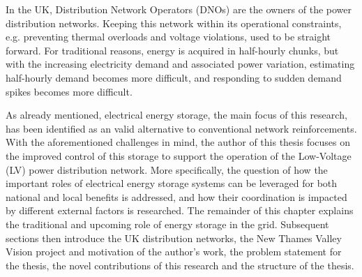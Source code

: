 In the UK, Distribution Network Operators (DNOs) are the owners of the power distribution networks.
Keeping this network within its operational constraints, e.g. preventing thermal overloads and voltage violations, used to be straight forward.
For traditional reasons, energy is acquired in half-hourly chunks, but with the increasing electricity demand and associated power variation, estimating half-hourly demand becomes more difficult, and responding to sudden demand spikes becomes more difficult.

As already mentioned, electrical energy storage, the main focus of this research, has been identified as an valid alternative to conventional network reinforcements.
With the aforementioned challenges in mind, the author of this thesis focuses on the improved control of this storage to support the operation of the Low-Voltage (LV) power distribution network.
More specifically, the question of how the important roles of electrical energy storage systems can be leveraged for both national and local benefits is addressed, and how their coordination is impacted by different external factors is researched.
The remainder of this chapter explains the traditional and upcoming role of energy storage in the grid.
Subsequent sections then introduce the UK distribution networks, the New Thames Valley Vision project and motivation of the author's work, the problem statement for the thesis, the novel contributions of this research and the structure of the thesis.

